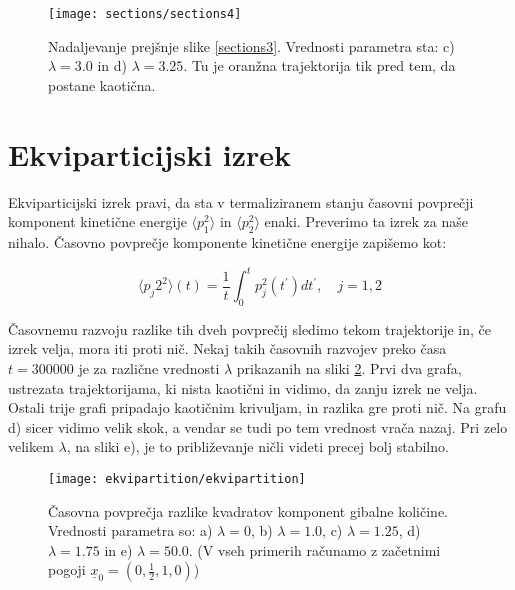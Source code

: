 \documentclass[a4paper]{article}
\newcommand{\half}{\frac{1}{2}}
\newcommand{\x}{\underline{x}}
\begin{document}
    \begin{figure}
        \centering
        \texttt{[image: sections/sections4]}
        \caption{Nadaljevanje prejšnje slike \ref{sections3}. Vrednosti parametra sta:
        c) $\lambda = 3.0$ in
        d) $\lambda = 3.25$.
        Tu je oranžna trajektorija tik pred tem, da postane kaotična.}
        \label{sections4}
    \end{figure}

    \section{Ekviparticijski izrek}

    Ekviparticijski izrek pravi, da sta v termaliziranem stanju časovni povprečji komponent kinetične energije $\langle p_1^2 \rangle$ in
    $\langle p_2^2 \rangle$ enaki. Preverimo ta izrek za naše nihalo. Časovno povprečje komponente kinetične energije zapišemo kot:

    \begin{equation}
        \langle p_j2^2 \rangle(t) = \frac{1}{t} \int_0^t p_j^2(t^\prime)dt^\prime, \quad j = 1, 2
    \end{equation}

    Časovnemu razvoju razlike tih dveh povprečij sledimo tekom trajektorije in, če izrek velja, mora iti proti nič. Nekaj takih časovnih razvojev
    preko časa $t = 300000$ je za različne vrednosti $\lambda$ prikazanih na sliki \ref{ekvipartition}. Prvi dva grafa, ustrezata trajektorijama, ki
    nista kaotični in vidimo, da zanju izrek ne velja. Ostali trije grafi pripadajo kaotičnim krivuljam, in razlika gre proti nič. Na grafu d) sicer
    vidimo velik skok, a vendar se tudi po tem vrednost vrača nazaj. Pri zelo velikem $\lambda$, na sliki e), je to približevanje ničli videti precej
    bolj stabilno.
 
    \begin{figure}
        \centering
        \texttt{[image: ekvipartition/ekvipartition]}
        \caption{Časovna povprečja razlike kvadratov komponent gibalne količine. Vrednosti parametra so:
        a) $\lambda = 0$,
        b) $\lambda = 1.0$,
        c) $\lambda = 1.25$,
        d) $\lambda = 1.75$ in
        e) $\lambda = 50.0$.
        (V vseh primerih računamo z začetnimi pogoji $\x_0 = (0, \half, 1, 0)$)}
        \label{ekvipartition}
    \end{figure}
\end{document}
